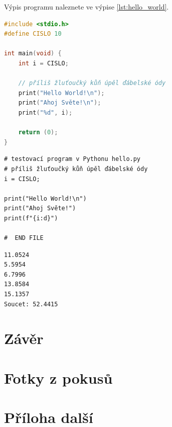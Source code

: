 \documentclass[12pt]{report}			%
\begin{document}
\lipsum[1]	

Výpis programu   naleznete ve výpise \ref{lst:hello_world}.

\begin{lstlisting}[language=C++,
	title={Program hello.c}, 
	caption={hello.c}, 
  	otherkeywords={define,\#,include },
	label={lst:hello_world}]
#include <stdio.h>
#define CISLO 10

int main(void) {
	int i = CISLO;

	// příliš žluťoučký kůň úpěl ďábelské ódy
	print("Hello World!\n");
	print("Ahoj Světe!\n");
	print("%d", i);

	return (0);
}
\end{lstlisting}

\lipsum[1]	

\begin{lstlisting}[firstnumber=10, title={Program hello.py}, caption={hello.py}, label={lst:hello_world_py}]
# testovací program v Pythonu hello.py
# příliš žluťoučký kůň úpěl ďábelské ódy
i = CISLO;

print("Hello World!\n")
print("Ahoj Světe!")
print(f"{i:d}")

#  END FILE
\end{lstlisting}

\lipsum[1]

\begin{lstlisting}[numbers=none, title={Příklad výstupního souboru}]
11.0524
5.5954
6.7996
13.8584
15.1357
Soucet: 52.4415
\end{lstlisting}

	\chapter*{Závěr}
	
		\lipsum[1]
	
	\nocite{*}
    \printbibliography					%
    \printglossary[title={Zkratky}]		%
    \listoffigures						%
    \listoftables						%

    \begin{appendices}
	\chapter{Fotky z pokusů}	
	\lipsum[1]
	\chapter{Příloha další }
	\end{appendices}
\end{document}
